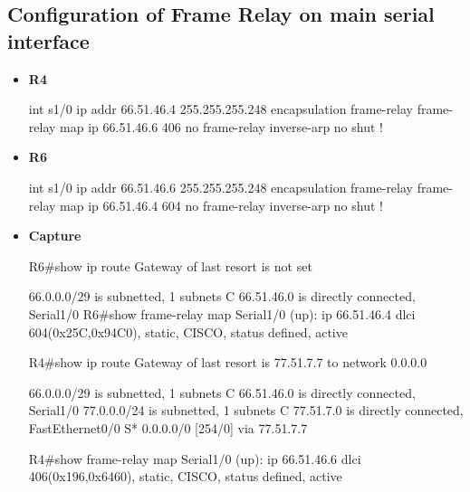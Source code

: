 \documentclass[10pt]{article}
\begin{document}
\subsection{Configuration of Frame Relay on main serial interface}
\begin{itemize}
\item {\bf R4}
\begin{verbatim*}
int s1/0
 ip addr 66.51.46.4 255.255.255.248
 encapsulation frame-relay
 frame-relay map ip 66.51.46.6 406
 no frame-relay inverse-arp
 no shut
!
\end{verbatim*}
\item {\bf R6}
\begin{verbatim*}
int s1/0
 ip addr 66.51.46.6 255.255.255.248
 encapsulation frame-relay
 frame-relay map ip 66.51.46.4 604
 no frame-relay inverse-arp
 no shut
!
\end{verbatim*}
\item {\bf Capture}
\begin{verbatim*}
R6#show ip route
Gateway of last resort is not set

66.0.0.0/29 is subnetted, 1 subnets
C       66.51.46.0 is directly connected, Serial1/0
R6#show frame-relay map
Serial1/0 (up): ip 66.51.46.4 dlci 604(0x25C,0x94C0), static,
                CISCO, status defined, active

R4#show ip route
Gateway of last resort is 77.51.7.7 to network 0.0.0.0

66.0.0.0/29 is subnetted, 1 subnets
C       66.51.46.0 is directly connected, Serial1/0
77.0.0.0/24 is subnetted, 1 subnets
C       77.51.7.0 is directly connected, FastEthernet0/0
S*   0.0.0.0/0 [254/0] via 77.51.7.7

R4#show frame-relay map
Serial1/0 (up): ip 66.51.46.6 dlci 406(0x196,0x6460), static,
                CISCO, status defined, active
\end{verbatim*}
\end{itemize}
\end{document}
